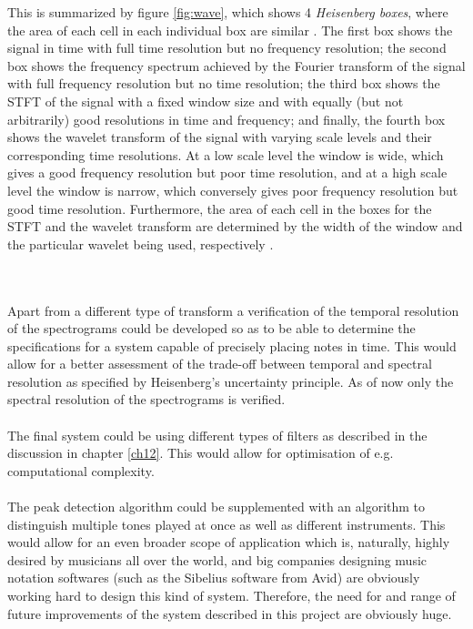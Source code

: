 This is summarized by figure \ref{fig:wave}, which shows 4 \textit{Heisenberg boxes}, where the area of each cell in each individual box are similar \cite{page 410, Wang}. The first box shows the signal in time with full time resolution but no frequency resolution; the second box shows the frequency spectrum achieved by the Fourier transform of the signal with full frequency resolution but no time resolution; the third box shows the STFT of the signal with a fixed window size and with equally (but not arbitrarily) good resolutions in time and frequency; and finally, the fourth box shows the wavelet transform of the signal with varying scale levels and their corresponding time resolutions. At a low scale level the window is wide, which gives a good frequency resolution but poor time resolution, and at a high scale level the window is narrow, which conversely gives poor frequency resolution but good time resolution. Furthermore, the area of each cell in the boxes for the STFT and the wavelet transform are determined by the width of the window and the particular wavelet being used, respectively \cite{pages 409-410, Wang} \cite{page 43-44, wave_tut}.


\\ \\
Apart from a different type of transform a verification of the temporal resolution of the spectrograms could be developed so as to be able to determine the specifications for a system capable of precisely placing notes in time. This would allow for a better assessment of the trade-off between temporal and spectral resolution as specified by Heisenberg's uncertainty principle. As of now only the spectral resolution of the spectrograms is verified.
\\\\
The final system could be using different types of filters as described in the discussion in chapter \ref{ch12}. This would allow for optimisation of e.g. computational complexity.
\\\\
The peak detection algorithm could be supplemented with an algorithm to distinguish multiple tones played at once as well as different instruments. This would allow for an even broader scope of application which is, naturally, highly desired by musicians all over the world, and big companies designing music notation softwares (such as the Sibelius software from Avid) are obviously working hard to design this kind of system. Therefore, the need for and range of future improvements of the system described in this project are obviously huge.